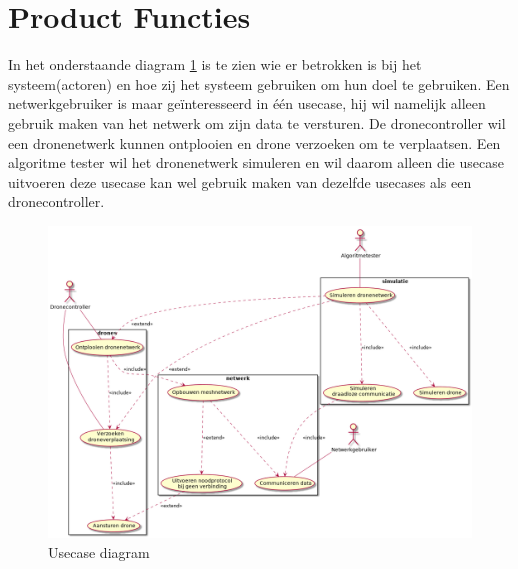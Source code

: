 \documentclass[a4paper, 11pt, oneside]{report}
\begin{document}
\section{Product Functies}
\label{inleiding:productfuncties}
In het onderstaande diagram \ref{fig:usecasediagram} is te zien wie er betrokken is bij het systeem(actoren) en hoe zij het systeem gebruiken om hun doel te gebruiken.
Een netwerkgebruiker is maar geïnteresseerd in één usecase, hij wil namelijk alleen gebruik maken van het netwerk om zijn data te versturen.
De dronecontroller wil een dronenetwerk kunnen ontplooien en drone verzoeken om te verplaatsen.
Een algoritme tester wil het dronenetwerk simuleren en wil daarom alleen die usecase uitvoeren deze usecase kan wel gebruik maken van dezelfde usecases als een dronecontroller. 
\begin{figure}[H]
	\begin{center}\includegraphics[width=.9\linewidth]{UML/out/usecase/usecasediagram/usecasediagram.png}\end{center}
	\caption{Usecase diagram}
	\label{fig:usecasediagram}
\end{figure}
\end{document}
